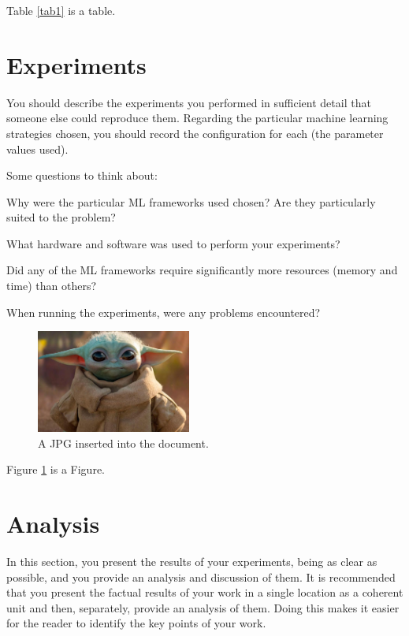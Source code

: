 \documentclass[jair,twoside,11pt,theapa]{article}
\begin{document}
Table \ref{tab1} is a table. 

\section{Experiments}
\label{experiments}

You should describe the experiments you performed in sufficient detail that someone else could reproduce them. Regarding the particular machine learning strategies chosen, you should record the configuration for each (the parameter values used).

Some questions to think about:

{\color{blue}\begin{compactenum}
\item Why were the particular ML frameworks used chosen? Are they particularly suited to the problem?
\item What hardware and software was used to perform your experiments?
\item Did any of the ML frameworks require significantly more resources (memory and time) than others?
\item When running the experiments, were any problems encountered?
\end{compactenum}}


\begin{figure}
\centering
  \includegraphics[width=2in]{grogu.jpg}
  \caption{A JPG inserted into the document.}\label{grogu}
\end{figure}

Figure \ref{grogu} is a Figure. 

\section{Analysis}

In this section, you present the results of your experiments, being as clear as possible, and you provide an analysis and discussion of them. It is recommended that you present the factual results of your work in a single location as a coherent unit and then, separately, provide an analysis of them. Doing this makes it easier for the reader to identify the key points of your work.
\end{document}
